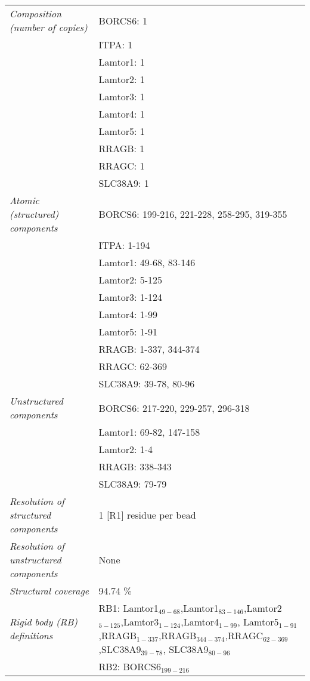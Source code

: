\documentclass[11pt,a4paper]{article}
\begin{document}
\begin{landscape}
\begin{longtable}{ p{} | p{} }
            \textit{Composition (number of copies)} & BORCS6: 1\\
            & ITPA: 1 \\
            & Lamtor1: 1 \\
            & Lamtor2: 1 \\
            & Lamtor3: 1 \\
            & Lamtor4: 1 \\
            & Lamtor5: 1 \\
            & RRAGB: 1 \\
            & RRAGC: 1 \\
            & SLC38A9: 1 \\
                \textit{Atomic (structured) components} & BORCS6: 199-216, 221-228, 258-295, 319-355\\
            & ITPA: 1-194 \\
            & Lamtor1: 49-68, 83-146 \\
            & Lamtor2: 5-125 \\
            & Lamtor3: 1-124 \\
            & Lamtor4: 1-99 \\
            & Lamtor5: 1-91 \\
            & RRAGB: 1-337, 344-374 \\
            & RRAGC: 62-369 \\
            & SLC38A9: 39-78, 80-96 \\
                \textit{Unstructured components} & BORCS6: 217-220, 229-257, 296-318\\
            & Lamtor1: 69-82, 147-158 \\
            & Lamtor2: 1-4 \\
            & RRAGB: 338-343 \\
            & SLC38A9: 79-79 \\
                \textit{Resolution of structured components} & 1 [R1] residue per bead\\
                \textit{Resolution of unstructured components} & None\\
                \textit{Structural coverage} & 94.74 \%\\
                \textit{Rigid body (RB) definitions} & RB1: Lamtor1$_{49-68}$,Lamtor1$_{83-146}$,Lamtor2$_{5-125}$,Lamtor3$_{1-124}$,Lamtor4$_{1-99}$, 
 Lamtor5$_{1-91}$,RRAGB$_{1-337}$,RRAGB$_{344-374}$,RRAGC$_{62-369}$,SLC38A9$_{39-78}$, 
 SLC38A9$_{80-96}$\\
            & RB2: BORCS6$_{199-216}$ \\

\end{longtable}
\end{landscape}
\end{document}
